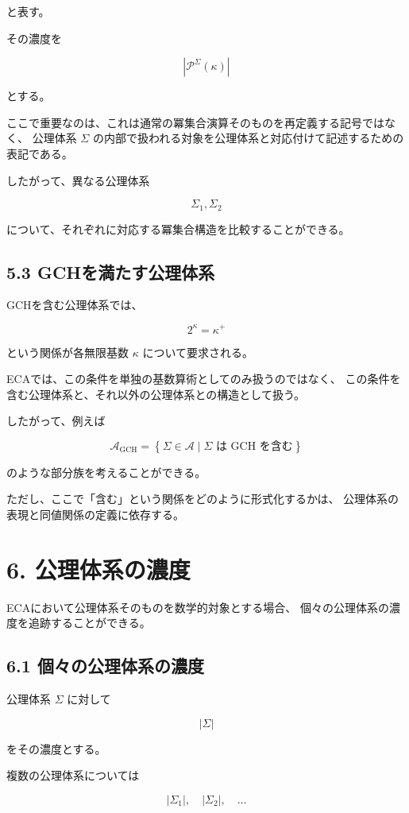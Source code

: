 \documentclass[11pt]{article}
\begin{document}
と表す。

その濃度を

\[
\left|\mathcal{P}^{\Sigma}(\kappa)\right|
\]

とする。

ここで重要なのは、これは通常の冪集合演算そのものを再定義する記号ではなく、
公理体系 $\Sigma$ の内部で扱われる対象を公理体系と対応付けて記述するための表記である。

したがって、異なる公理体系

\[
\Sigma_1,\Sigma_2
\]

について、それぞれに対応する冪集合構造を比較することができる。

\subsection{5.3 GCHを満たす公理体系}

GCHを含む公理体系では、

\[
2^\kappa=\kappa^+
\]

という関係が各無限基数 $\kappa$ について要求される。

ECAでは、この条件を単独の基数算術としてのみ扱うのではなく、
この条件を含む公理体系と、それ以外の公理体系との構造として扱う。

したがって、例えば

\[
\mathscr{A}_{\mathrm{GCH}}
=
\left\{
\Sigma\in\mathscr{A}
\mid
\Sigma\text{ は GCH を含む}
\right\}
\]

のような部分族を考えることができる。

ただし、ここで「含む」という関係をどのように形式化するかは、
公理体系の表現と同値関係の定義に依存する。

\section{6. 公理体系の濃度}

ECAにおいて公理体系そのものを数学的対象とする場合、
個々の公理体系の濃度を追跡することができる。

\subsection{6.1 個々の公理体系の濃度}

公理体系 $\Sigma$ に対して

\[
|\Sigma|
\]

をその濃度とする。

複数の公理体系については

\[
|\Sigma_1|,\quad|\Sigma_2|,\quad\ldots
\]
\end{document}
